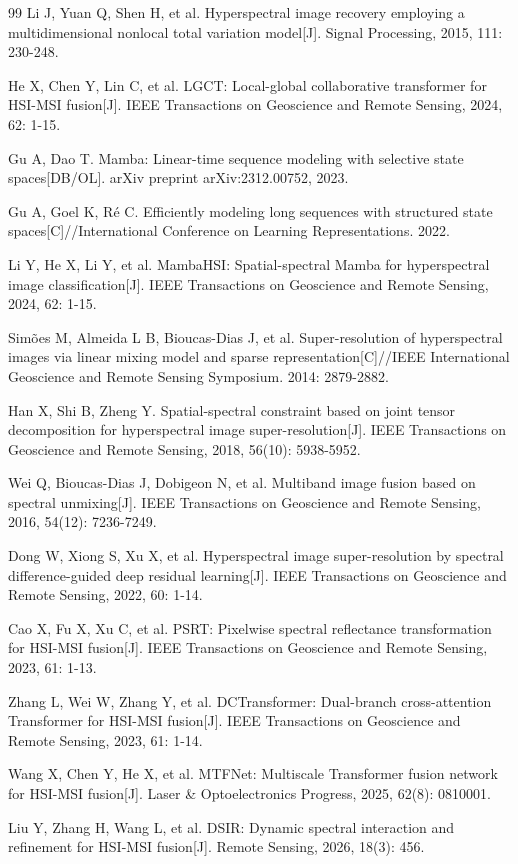 \documentclass[UTF8,a4paper,11pt]{ctexart}
\begin{document}
\begin{thebibliography}{99}
 Li J, Yuan Q, Shen H, et al. Hyperspectral image recovery employing a multidimensional nonlocal total variation model[J]. Signal Processing, 2015, 111: 230-248.

 He X, Chen Y, Lin C, et al. LGCT: Local-global collaborative transformer for HSI-MSI fusion[J]. IEEE Transactions on Geoscience and Remote Sensing, 2024, 62: 1-15.

 Gu A, Dao T. Mamba: Linear-time sequence modeling with selective state spaces[DB/OL]. arXiv preprint arXiv:2312.00752, 2023.

 Gu A, Goel K, R\'e C. Efficiently modeling long sequences with structured state spaces[C]//International Conference on Learning Representations. 2022.

 Li Y, He X, Li Y, et al. MambaHSI: Spatial-spectral Mamba for hyperspectral image classification[J]. IEEE Transactions on Geoscience and Remote Sensing, 2024, 62: 1-15.

 Sim\~oes M, Almeida L B, Bioucas-Dias J, et al. Super-resolution of hyperspectral images via linear mixing model and sparse representation[C]//IEEE International Geoscience and Remote Sensing Symposium. 2014: 2879-2882.

 Han X, Shi B, Zheng Y. Spatial-spectral constraint based on joint tensor decomposition for hyperspectral image super-resolution[J]. IEEE Transactions on Geoscience and Remote Sensing, 2018, 56(10): 5938-5952.

 Wei Q, Bioucas-Dias J, Dobigeon N, et al. Multiband image fusion based on spectral unmixing[J]. IEEE Transactions on Geoscience and Remote Sensing, 2016, 54(12): 7236-7249.

 Dong W, Xiong S, Xu X, et al. Hyperspectral image super-resolution by spectral difference-guided deep residual learning[J]. IEEE Transactions on Geoscience and Remote Sensing, 2022, 60: 1-14.

 Cao X, Fu X, Xu C, et al. PSRT: Pixelwise spectral reflectance transformation for HSI-MSI fusion[J]. IEEE Transactions on Geoscience and Remote Sensing, 2023, 61: 1-13.

 Zhang L, Wei W, Zhang Y, et al. DCTransformer: Dual-branch cross-attention Transformer for HSI-MSI fusion[J]. IEEE Transactions on Geoscience and Remote Sensing, 2023, 61: 1-14.

 Wang X, Chen Y, He X, et al. MTFNet: Multiscale Transformer fusion network for HSI-MSI fusion[J]. Laser \& Optoelectronics Progress, 2025, 62(8): 0810001.

 Liu Y, Zhang H, Wang L, et al. DSIR: Dynamic spectral interaction and refinement for HSI-MSI fusion[J]. Remote Sensing, 2026, 18(3): 456.
\end{thebibliography}

\end{document}
